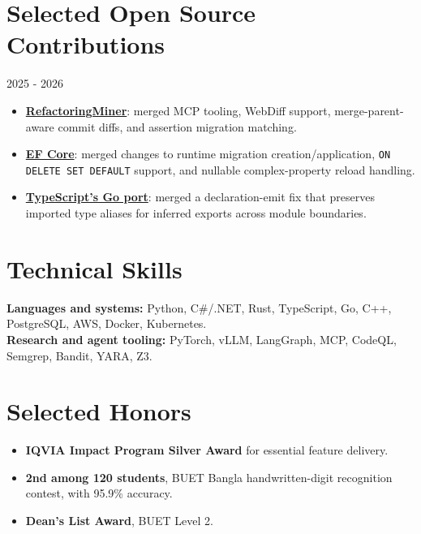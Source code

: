 \documentclass[a4paper,11pt]{article}
\newcommand{\resumeItemListStart}{\begin{itemize}[leftmargin=*,labelsep=1mm,itemsep=0.5mm]}
\newcommand{\resumeItemListEnd}{\end{itemize}\vspace{-2mm}}
\begin{document}
\section{\textbf{Selected Open Source Contributions}}
{\small 2025 - 2026}
\resumeItemListStart
\item \textbf{\href{https://github.com/tsantalis/RefactoringMiner/pulls?q=author\%3Athromel}{RefactoringMiner}}: merged MCP tooling, WebDiff support, merge-parent-aware commit diffs, and assertion migration matching.
\item \textbf{\href{https://github.com/dotnet/efcore}{EF Core}}: merged changes to runtime migration creation/application, \texttt{ON DELETE SET DEFAULT} support, and nullable complex-property reload handling.
\item \textbf{\href{https://github.com/microsoft/typescript-go/pull/3314}{TypeScript's Go port}}: merged a declaration-emit fix that preserves imported type aliases for inferred exports across module boundaries.
\resumeItemListEnd

\section{\textbf{Technical Skills}}
{\small
\textbf{Languages and systems:} Python, C\#/.NET, Rust, TypeScript, Go, C++, PostgreSQL, AWS, Docker, Kubernetes.\\[2pt]
\textbf{Research and agent tooling:} PyTorch, vLLM, LangGraph, MCP, CodeQL, Semgrep, Bandit, YARA, Z3.
}

\section{\textbf{Selected Honors}}
\resumeItemListStart
\item \textbf{IQVIA Impact Program Silver Award} for essential feature delivery.
\item \textbf{2nd among 120 students}, BUET Bangla handwritten-digit recognition contest, with 95.9\% accuracy.
\item \textbf{Dean's List Award}, BUET Level 2.
\resumeItemListEnd
\end{document}
